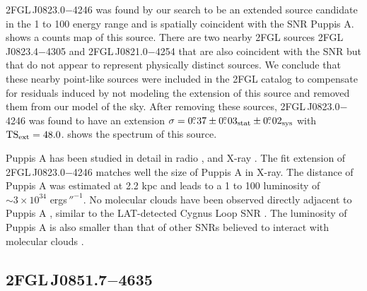 2FGL\,J0823.0$-$4246 was found by our search to be an extended source
candidate in the 1 \gev to 100 \gev energy range and is spatially
coincident with the SNR Puppis A.   shows
a counts map of this source. There are two nearby 2FGL sources 2FGL\,J0823.4$-$4305
and 2FGL\,J0821.0$-$4254 that are also coincident with the SNR but that
do not appear to represent physically distinct sources.
We conclude that
these nearby point-like sources
were included in the 2FGL catalog to compensate for residuals induced
by not modeling the extension of this source and
removed them from our model of the sky.
After removing these sources, 2FGL\,J0823.0$-$4246 was found to have an extension 
$\sigma=0\mbox{$.\!\!^\circ$}37\pm0\mbox{$.\!\!^\circ$}03_\text{stat}\pm0\mbox{$.\!\!^\circ$}02_\text{sys}$ with 
$\mathrm{TS}_\mathrm{ext}=48.0$.   shows the spectrum of
this source.

Puppis A has been studied in detail in radio \citep{castelletti_2006a_observations-puppis}, 
and  X-ray \citep{petre_1996a_central-stellar,hwang_2008a_x-ray-emitting-ejecta}.
The fit extension of 2FGL\,J0823.0$-$4246
matches well the size of Puppis A in X-ray.  The distance of Puppis A was
estimated at 2.2 kpc \citep{reynoso_1995a_observations-neutral,reynoso_2003a_observations-neutral} and leads to a 1
\gev to 100 \gev luminosity of $\sim 3\times 10^{34}$ ergs$\,\second^{-1}$.
No molecular clouds have been observed directly adjacent to Puppis A
\citep{paron_2008a_high-resolution-observations}, similar to the LAT-detected Cygnus Loop SNR
\citep{katagiri_2011a_fermi-large}.  The luminosity of Puppis A is also smaller
than that of other SNRs believed to interact with molecular clouds
\citep{abdo_2009a_fermi-discovery,abdo_2010a_observation-supernova,abdo_2010a_gamma-ray-emission,abdo_2010d_fermi-large,abdo_2010a_fermi-lat-study}.

\subsection{2FGL\,J0851.7$-$4635}



